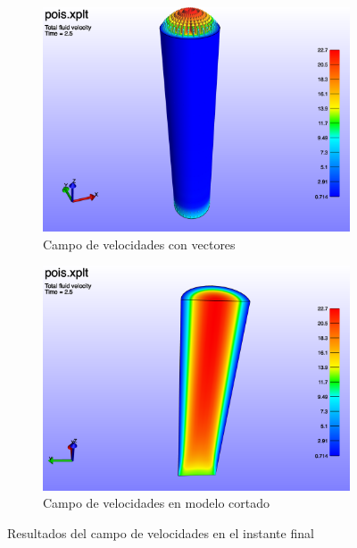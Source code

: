 \begin{figure}[!ht]
\centering
\begin{subfigure}[b]{0.48\textwidth}
\centering
\includegraphics[width=\linewidth]{figuras_4/pois_va.png}
\caption{Campo de velocidades con vectores}
\label{fig:pois_va}
\end{subfigure}
\hfil
\begin{subfigure}[b]{0.48\textwidth}
\includegraphics[width=\linewidth]{figuras_4/pois_vh1.png}
\caption{Campo de velocidades en modelo cortado}
\label{fig:pois_vh1}
\end{subfigure}
\caption{Resultados del campo de velocidades en el instante final}
\label{fig:pois_v}
\end{figure}

